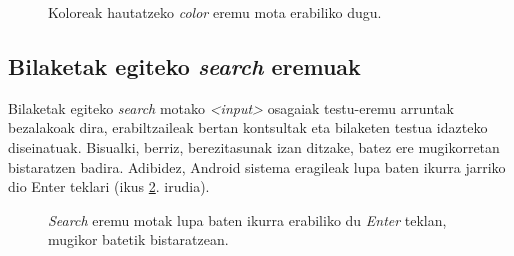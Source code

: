 \begin{figure}[ht]
	\centering
{}
\caption{Koloreak hautatzeko \textit{color} eremu mota erabiliko dugu.}
\label{fig:colorinput}
\end{figure}

\subsection{Bilaketak egiteko \textit{search} eremuak}
Bilaketak egiteko \textit{search} motako \textit{<input>} osagaiak testu-eremu arruntak bezalakoak dira, erabiltzaileak bertan kontsultak eta bilaketen testua idazteko diseinatuak. Bisualki, berriz, berezitasunak izan ditzake, batez ere mugikorretan bistaratzen badira. Adibidez, Android sistema eragileak lupa baten ikurra jarriko dio Enter teklari (ikus \ref{fig:searchinput}. irudia).

\begin{figure}[ht]
	\centering
{}
\caption{\textit{Search} eremu motak lupa baten ikurra erabiliko du \textit{Enter} teklan, mugikor batetik bistaratzean.}
\label{fig:searchinput}
\end{figure}


